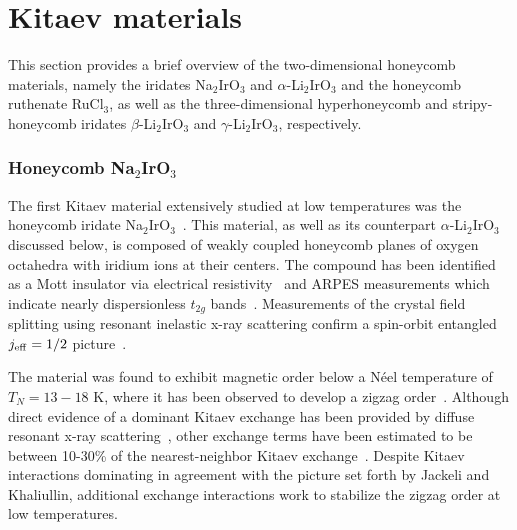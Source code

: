 %
%
\section{Kitaev materials}
\label{section:chapter03_Materials}
%
%
This section provides a brief overview of the two-dimensional honeycomb materials, namely the iridates Na$_2$IrO$_3$ and $\alpha$-Li$_2$IrO$_3$ and the honeycomb ruthenate RuCl$_3$, as well as the three-dimensional hyperhoneycomb and stripy-honeycomb iridates $\beta$-Li$_2$IrO$_3$ and $\gamma$-Li$_2$IrO$_3$, respectively.


%
%
\subsubsection{Honeycomb Na$_2$IrO$_3$}
%
%
The first Kitaev material extensively studied at low temperatures was the honeycomb iridate Na$_2$IrO$_3$~\cite{SinghPRB2010}.
This material, as well as its counterpart $\alpha$-Li$_2$IrO$_3$ discussed below, is composed of weakly coupled honeycomb planes of oxygen octahedra with iridium ions at their centers.
The compound has been identified as a Mott insulator via electrical resistivity~\cite{SinghPRB2010} and ARPES measurements which indicate nearly dispersionless $t_{2g}$ bands~\cite{CominPRL2012,AlidoustPRB2016,LuepkePRB2015}.
Measurements of the crystal field splitting using resonant inelastic x-ray scattering confirm a spin-orbit entangled $j_{\rm eff} = 1/2$ picture~\cite{GretarssonPRL2013}.

The  material was found to exhibit magnetic order below a N\'eel temperature of $T_N = 13 - 18$ K, where it has been observed to develop a zigzag order~\cite{SinghPRB2010,ChoiPRL2012,YePRB2012,LiuPRB2011}.
Although direct evidence of a dominant Kitaev exchange has been provided by diffuse resonant x-ray scattering~\cite{BarreiroNatPhys2015}, other exchange terms have been estimated to be between 10-30\% of the nearest-neighbor Kitaev exchange~\cite{KatukuriNJP2014,WinterPRB2016,KimchiPRB2011,ChoiPRL2012,ChaloupkaPRB2016}.
Despite Kitaev interactions dominating in agreement with the picture set forth by Jackeli and Khaliullin, additional exchange interactions work to stabilize the zigzag order at low temperatures.


